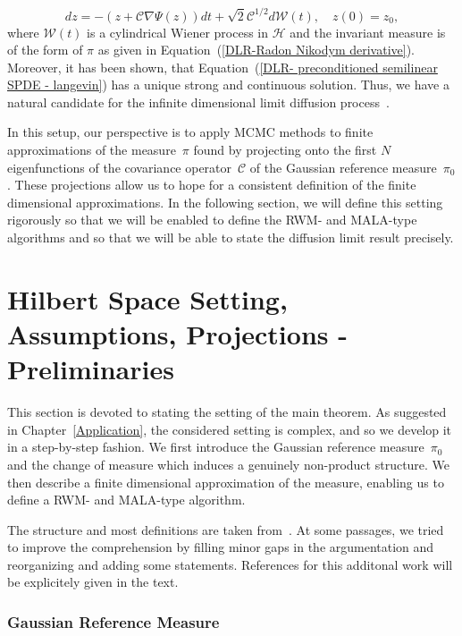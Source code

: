 \begin{equation}
\label{DLR-limit diffusion candidate}
 dz = - ( z + \mathcal{C} \nabla \Psi (z) ) dt + \sqrt{2} \mathcal{C}^{1/2} d \mathcal{W}(t), \quad z(0) = z_0,
\end{equation}
where $ \mathcal{W}(t) $ is a cylindrical Wiener process in $\mathcal{H}$ and the invariant measure is of the form of $\pi$ as given in Equation~(\ref{DLR-Radon Nikodym derivative}). Moreover, it has been shown, that Equation~(\ref{DLR- preconditioned semilinear SPDE - langevin}) has a unique strong and continuous solution. Thus, we have a natural candidate for the infinite dimensional limit diffusion process~\autocite[Theorem 3.6]{Hairer2007}.
\newline

In this setup, our perspective is to apply MCMC methods to finite approximations of the measure~$\pi$ found by projecting onto the first $N$ eigenfunctions of the covariance operator~$\mathcal{C}$ of the Gaussian reference measure~$\pi_0$. These projections allow us to hope for a consistent definition of the finite dimensional approximations. In the following section, we will define this setting rigorously so that we will be enabled to define the RWM- and MALA-type algorithms and so that we will be able to state the diffusion limit result precisely.


\section{Hilbert Space Setting, Assumptions, Projections - Preliminaries}
\label{sec:DLR-Preliminaries}

This section is devoted to stating the setting of the main theorem. As suggested in Chapter~\ref{Application}, the considered setting is complex, and so we develop it in a step-by-step fashion. We first introduce the Gaussian reference measure~$\pi_0$ and the change of measure which induces a genuinely non-product structure. We then describe a finite dimensional approximation of the measure, enabling us to define a RWM- and MALA-type algorithm.

The structure and most definitions are taken from~\autocite[Section 2]{Pillai2012}. At some passages, we tried to improve the comprehension by filling minor gaps in the argumentation and reorganizing and adding some statements. References for this additonal work will be explicitely given in the text.

\subsubsection{Gaussian Reference Measure}

